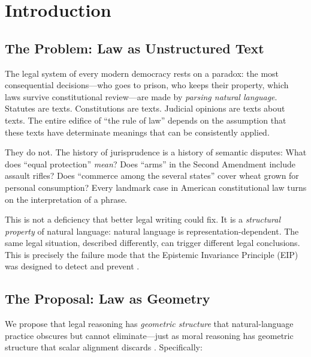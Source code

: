 \documentclass[12pt]{article}
\theoremstyle{definition}
\theoremstyle{remark}
\begin{document}
\newpage
\tableofcontents
\newpage


\section{Introduction}
\label{sec:intro}

\subsection{The Problem: Law as Unstructured Text}

The legal system of every modern democracy rests on a paradox: the most consequential decisions---who goes to prison, who keeps their property, which laws survive constitutional review---are made by \emph{parsing natural language}.  Statutes are texts.  Constitutions are texts.  Judicial opinions are texts about texts.  The entire edifice of ``the rule of law'' depends on the assumption that these texts have determinate meanings that can be consistently applied.

They do not.  The history of jurisprudence is a history of semantic disputes: What does ``equal protection'' \emph{mean}?  Does ``arms'' in the Second Amendment include assault rifles?  Does ``commerce among the several states'' cover wheat grown for personal consumption?  Every landmark case in American constitutional law turns on the interpretation of a phrase.

This is not a deficiency that better legal writing could fix.  It is a \emph{structural property} of natural language: natural language is representation-dependent.  The same legal situation, described differently, can trigger different legal conclusions.  This is precisely the failure mode that the Epistemic Invariance Principle (EIP) was designed to detect and prevent \cite{bond2025eip}.

\subsection{The Proposal: Law as Geometry}

We propose that legal reasoning has \emph{geometric structure} that natural-language practice obscures but cannot eliminate---just as moral reasoning has geometric structure that scalar alignment discards \cite{bond2026geometric}.  Specifically:
\end{document}
